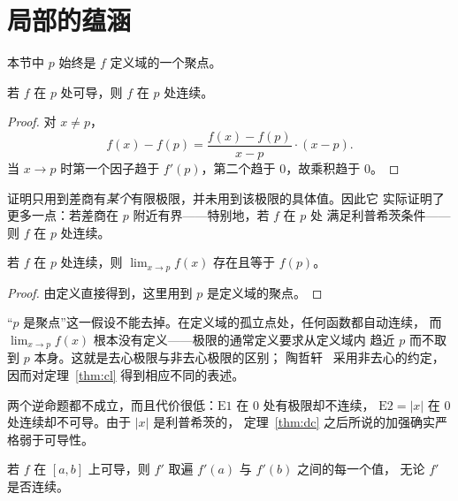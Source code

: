 \section{局部的蕴涵}
\label{sec:local}

本节中 $p$ 始终是 $f$ 定义域的一个聚点。

\begin{theorem}\label{thm:dc}
若 $f$ 在 $p$ 处可导，则 $f$ 在 $p$ 处连续。
\end{theorem}

\begin{proof}
对 $x \ne p$，
\[ f(x)-f(p) = \frac{f(x)-f(p)}{x-p}\cdot(x-p). \]
当 $x \to p$ 时第一个因子趋于 $f'(p)$，第二个趋于 $0$，故乘积趋于 $0$。
\end{proof}

证明只用到差商有\emph{某个}有限极限，并未用到该极限的具体值。因此它
实际证明了更多一点：若差商在 $p$ 附近有界——特别地，若 $f$ 在 $p$ 处
满足利普希茨条件——则 $f$ 在 $p$ 处连续。

\begin{theorem}\label{thm:cl}
若 $f$ 在 $p$ 处连续，则 $\lim_{x\to p} f(x)$ 存在且等于 $f(p)$。
\end{theorem}

\begin{proof}
由定义直接得到，这里用到 $p$ 是定义域的聚点。
\end{proof}

\begin{remark}
“$p$ 是聚点”这一假设不能去掉。在定义域的孤立点处，任何函数都自动连续，
而 $\lim_{x\to p}f(x)$ 根本没有定义——极限的通常定义要求从定义域内
趋近 $p$ 而不取到 $p$ 本身。这就是去心极限与非去心极限的区别；
陶哲轩~\cite[\S9.3]{taoI} 采用非去心的约定，因而对定理~\ref{thm:cl}
得到相应不同的表述。
\end{remark}

两个逆命题都不成立，而且代价很低：$\mathrm{E}1$ 在 $0$ 处有极限却不连续，
$\mathrm{E}2=|x|$ 在 $0$ 处连续却不可导。由于 $|x|$ 是利普希茨的，
定理~\ref{thm:dc} 之后所说的加强确实严格弱于可导性。

\begin{theorem}[达布]\label{thm:darboux}
若 $f$ 在 $[a,b]$ 上可导，则 $f'$ 取遍 $f'(a)$ 与 $f'(b)$ 之间的每一个值，
无论 $f'$ 是否连续。
\end{theorem}

